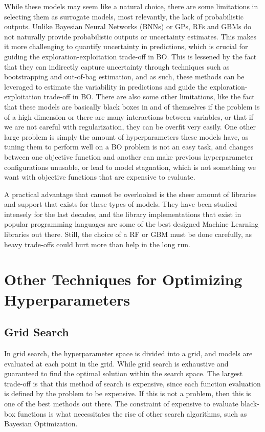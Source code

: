 While these models may seem like a natural choice, there are some limitations in selecting them as surrogate models, most relevantly, the lack of probabilistic outputs. Unlike Bayesian Neural Networks (BNNs) or GPs, RFs and GBMs do not naturally provide probabilistic outputs or uncertainty estimates. This makes it more challenging to quantify uncertainty in predictions, which is crucial for guiding the exploration-exploitation trade-off in BO. This is lessened by the fact that they can indirectly capture uncertainty through techniques such as bootstrapping and out-of-bag estimation, and as such, these methods can be leveraged to estimate the variability in predictions and guide the exploration-exploitation trade-off in BO. There are also some other limitations, like the fact that these models are basically black boxes in and of themselves if the problem is of a high dimension or there are many interactions between variables, or that if we are not careful with regularization, they can be overfit very easily. One other large problem is simply the amount of hyperparameters these models have, as tuning them to perform well on a BO problem is not an easy task, and changes between one objective function and another can make previous hyperparameter configurations unusable, or lead to model stagnation, which is not something we want with objective functions that are expensive to evaluate. 

A practical advantage that cannot be overlooked is the sheer amount of libraries and support that exists for these types of models. They have been studied intensely for the last decades, and the library implementations that exist in popular programming languages are some of the best designed Machine Learning libraries out there. Still, the choice of a RF or GBM must be done carefully, as heavy trade-offs could hurt more than help in the long run. 

\section{Other Techniques for Optimizing Hyperparameters}

\subsection{Grid Search}

In grid search, the hyperparameter space is divided into a grid, and models are evaluated at each point in the grid. While grid search is exhaustive and guaranteed to find the optimal solution within the search space. The largest trade-off is that this method of search is expensive, since each function evaluation is defined by the problem to be expensive. If this is not a problem, then this is one of the best methods out there. The constraint of expensive to evaluate black-box functions is what necessitates the rise of other search algorithms, such as Bayesian Optimization. 

